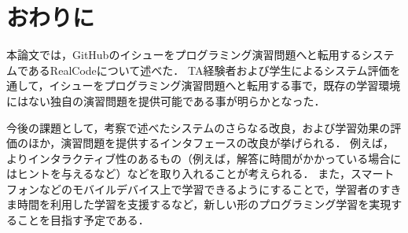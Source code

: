 \chapter{おわりに}
\graphicspath{{Chapter8/Figs/}}


本論文では，GitHubのイシューをプログラミング演習問題へと転用するシステムであるRealCodeについて述べた．
TA経験者および学生によるシステム評価を通して，イシューをプログラミング演習問題へと転用する事で，既存の学習環境にはない独自の演習問題を提供可能である事が明らかとなった．

今後の課題として，考察で述べたシステムのさらなる改良，および学習効果の評価のほか，演習問題を提供するインタフェースの改良が挙げられる．
例えば，よりインタラクティブ性のあるもの（例えば，解答に時間がかかっている場合にはヒントを与えるなど）などを取り入れることが考えられる．
また，スマートフォンなどのモバイルデバイス上で学習できるようにすることで，学習者のすきま時間を利用した学習を支援するなど，新しい形のプログラミング学習を実現することを目指す予定である．
